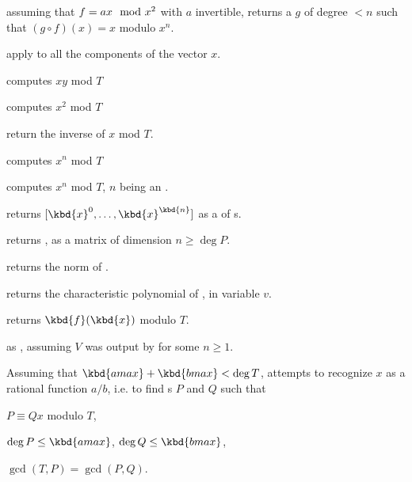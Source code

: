  assuming that $f = a\*x \mod{x^2}$
with $a$ invertible, returns a  $g$ of degree $< n$ such that $(g
\circ f)(x) = x$ modulo $x^n$.


 apply 
to all the components of the vector $x$.


 computes $xy$ mod $T$

 computes $x^2$ mod $T$

 return the inverse of $x$ mod $T$.

 computes $x^n$ mod $T$

 computes $x^n$ mod $T$,
$n$ being an .

 returns $[\kbd{x}^0,
\dots, \kbd{x}^\kbd{n}]$ as a  of s.

 returns
, as a matrix of dimension $n \geq \deg P$.

 returns the norm of .

 returns the characteristic
polynomial of , in variable $v$.

 returns $\kbd{f}(\kbd{x})$ modulo
$T$.

 as ,
assuming $V$ was output by  for some $n\geq 1$.

Assuming that $\kbd{amax}+\kbd{bmax}<\deg T$, attempts to recognize $x$ as a
rational function $a/b$, i.e. to find s $P$ and $Q$ such that

\item $P \equiv Q x$ modulo $T$,

\item $\deg P \leq \kbd{amax}$, $\deg Q \leq \kbd{bmax}$,

\item $\gcd(T,P) = \gcd(P,Q)$.

